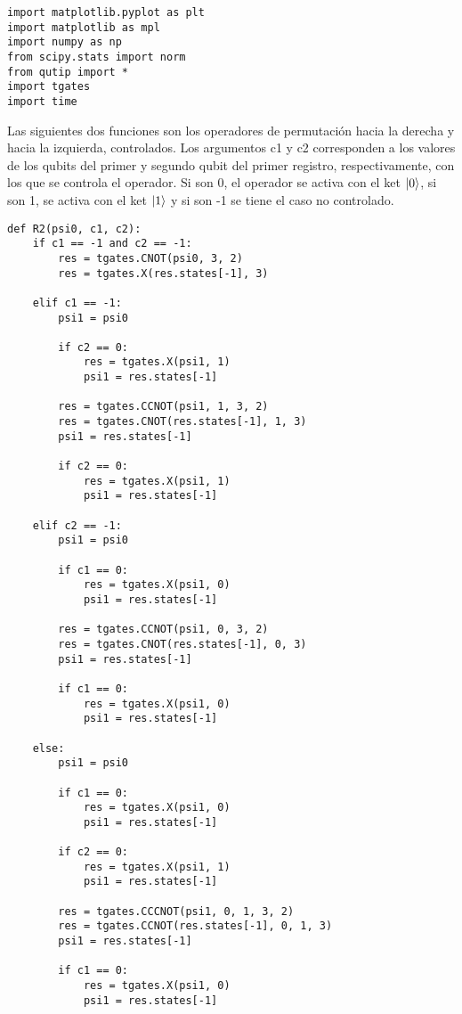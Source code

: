 \begin{verbatim}
import matplotlib.pyplot as plt
import matplotlib as mpl
import numpy as np
from scipy.stats import norm
from qutip import *
import tgates
import time
\end{verbatim}

Las siguientes dos funciones son los operadores de permutación hacia la derecha y hacia la izquierda, controlados. Los argumentos c1 y c2 corresponden a los valores de los qubits del primer y segundo qubit del primer registro, respectivamente, con los que se controla el operador. Si son 0, el operador se activa con el ket $\ket{0}$, si son 1, se activa con el ket $\ket{1}$ y si son -1 se tiene el caso no controlado.

\begin{verbatim}
def R2(psi0, c1, c2):
    if c1 == -1 and c2 == -1:
        res = tgates.CNOT(psi0, 3, 2)
        res = tgates.X(res.states[-1], 3)

    elif c1 == -1:
        psi1 = psi0

        if c2 == 0:
            res = tgates.X(psi1, 1)
            psi1 = res.states[-1]

        res = tgates.CCNOT(psi1, 1, 3, 2)
        res = tgates.CNOT(res.states[-1], 1, 3)
        psi1 = res.states[-1]

        if c2 == 0:
            res = tgates.X(psi1, 1)
            psi1 = res.states[-1]

    elif c2 == -1:
        psi1 = psi0

        if c1 == 0:
            res = tgates.X(psi1, 0)
            psi1 = res.states[-1]

        res = tgates.CCNOT(psi1, 0, 3, 2)
        res = tgates.CNOT(res.states[-1], 0, 3)
        psi1 = res.states[-1]

        if c1 == 0:
            res = tgates.X(psi1, 0)
            psi1 = res.states[-1]

    else:
        psi1 = psi0

        if c1 == 0:
            res = tgates.X(psi1, 0)
            psi1 = res.states[-1]

        if c2 == 0:
            res = tgates.X(psi1, 1)
            psi1 = res.states[-1]

        res = tgates.CCCNOT(psi1, 0, 1, 3, 2)
        res = tgates.CCNOT(res.states[-1], 0, 1, 3)
        psi1 = res.states[-1]

        if c1 == 0:
            res = tgates.X(psi1, 0)
            psi1 = res.states[-1]


\end{verbatim}
